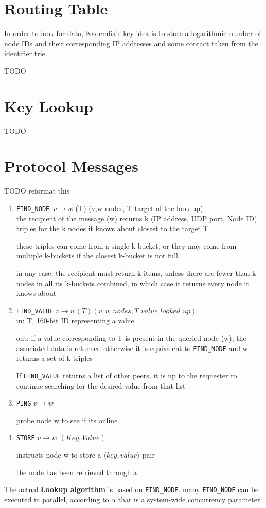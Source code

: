 \section{Routing Table}
In order to look for data, Kademlia's key idea is to \ul{store a logarithmic number of node IDs and their corresponding IP} addresses and some contact taken from the identifier trie.

TODO

\section{Key Lookup}

TODO

\section{Protocol Messages}
TODO reformat this
\begin{enumerate}
   \item \texttt{FIND\_NODE $v\longrightarrow w$} (T) (v,w nodes, T target of the look up)\\
   the recipient of the message (w) returns k (IP address, UDP port, Node
   ID) triples for the k nodes it knows about closest to the target T.
   
   these triples can come from a single k-bucket, or they may come from multiple
   k-buckets if the closest k-bucket is not full.
   
   in any case, the recipient must return k items, unless there are fewer than k
   nodes in all its k-buckets combined, in which case it returns every node it
   knows about 



   
   \item \texttt{FIND\_VALUE} $v \longrightarrow w(T)(v,w \textit{ nodes}, T \textit{ value looked up})$\\
   in: T, 160-bit ID representing a value
   
   out:
   if a value corresponding to T is present in the queried node (w), the
   associated data is returned
   otherwise it is equivalent to \texttt{FIND\_NODE} and w returns a set of k triples
   
   If \texttt{FIND\_VALUE} returns a list of other peers, it is up to the requester to continue
   searching for the desired value from that list
   
   \item \texttt{PING} $v \longrightarrow w$
   
   probe node w to see if its online
   \item \texttt{STORE} $v \longrightarrow w$ $(Key, Value)$
   
   instructs node w to store a $\langle key, value \rangle$ pair
   
   the node has been retrieved through a
\end{enumerate}
The actual \textbf{Lookup algorithm} is based on \texttt{FIND\_NODE}.
many \texttt{FIND\_NODE} can be executed in parallel, according to $\alpha$ that is a system-wide concurrency parameter.
